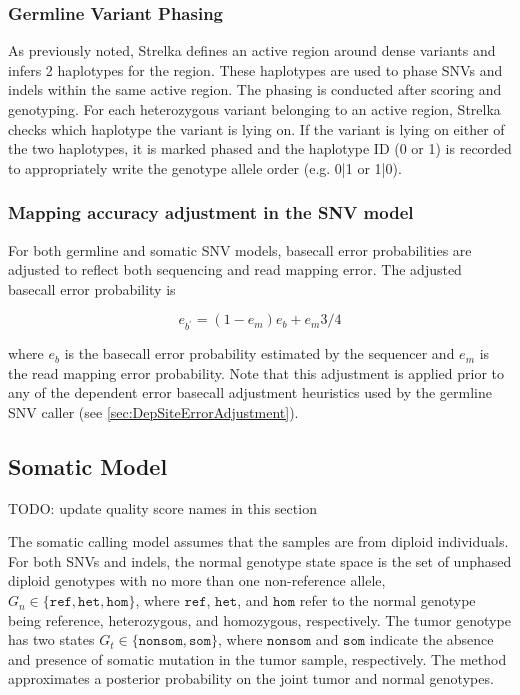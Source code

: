 \documentclass{article}
\begin{document}
\subsubsection{Germline Variant Phasing}
\label{sec:ReadBackedPhasing}
As previously noted, Strelka defines an active region around dense variants and infers 2 haplotypes for the region. These haplotypes are used to phase SNVs and indels within the same active region. The phasing is conducted after scoring and genotyping. For each heterozygous variant belonging to an active region, Strelka checks which haplotype the variant is lying on. If the variant is lying on either of the two haplotypes, it is marked phased and the haplotype ID (0 or 1) is recorded to appropriately write the genotype allele order (e.g. 0|1 or 1|0).

\subsubsection{Mapping accuracy adjustment in the SNV model}


For both germline and somatic SNV models, basecall error probabilities are adjusted to reflect both sequencing and read mapping error. The adjusted basecall error probability is

\begin{equation*}
e_{b^{\prime}} = (1-e_m)e_b + e_m 3/4
\end{equation*}

where $e_b$ is the basecall error probability estimated by the sequencer and $e_m$ is the read mapping error probability. Note that this adjustment is applied prior to any of the dependent error basecall adjustment heuristics used by the germline SNV caller (see \ref{sec:DepSiteErrorAdjustment}).

\subsection{Somatic Model}
\label{sec:somatic}

TODO: update quality score names in this section

The somatic calling model assumes that the samples are from diploid individuals. For both SNVs and indels, the normal genotype state space is the set of unphased diploid genotypes with no more than one non-reference allele, $G_n \in \{ \texttt{ref}, \texttt{het}, \texttt{hom}\}$, where $\texttt{ref}$, $\texttt{het}$, and $\texttt{hom}$ refer to the normal genotype being reference, heterozygous, and homozygous, respectively. The tumor genotype has two states $G_t \in \{ \texttt{nonsom}, \texttt{som} \}$, where $\texttt{nonsom}$ and $\texttt{som}$ indicate the absence and presence of somatic mutation in the tumor sample, respectively. The method approximates a posterior probability on the joint tumor and normal genotypes.
\end{document}
